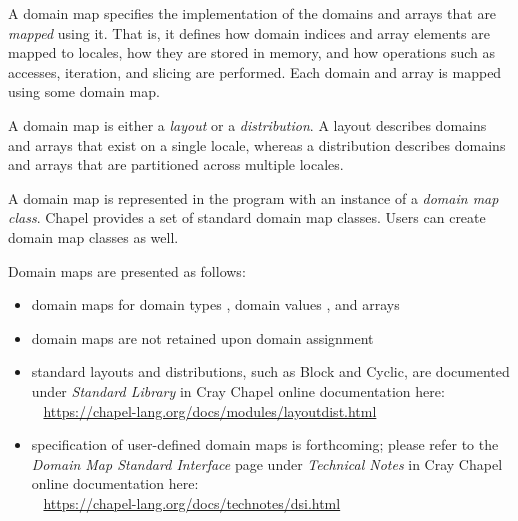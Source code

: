 \label{Domain_Maps}

A domain map specifies the implementation of the domains and arrays
that are \emph{mapped} using it. That is, it defines how domain indices
and array elements are mapped to locales, how they are stored in
memory, and how operations such as accesses, iteration, and slicing
are performed.  Each domain and array is mapped using some domain map.

A domain map is either a \emph{layout} or a \emph{distribution}.
A layout describes domains and arrays that exist on a single locale,
whereas a distribution describes domains and arrays that are
partitioned across multiple locales.

A domain map is represented in the program with an instance of
a \emph{domain map class}.
Chapel provides a set of standard domain map classes.
Users can create domain map classes as well.

Domain maps are presented as follows:
\begin{itemize}

\item domain maps for domain types ,
      domain values , and
      arrays 

\item domain maps are not retained upon domain assignment

\item standard layouts and distributions, such as Block and Cyclic,
are documented under \emph{Standard Library}
in Cray Chapel online documentation here:
\\ %
\mbox{$$ $$ $$} %
\url{https://chapel-lang.org/docs/modules/layoutdist.html}

\item specification of user-defined domain maps is forthcoming;
please refer to the \emph{Domain Map Standard Interface} page
under \emph{Technical Notes}
in Cray Chapel online documentation here:
\\ %
\mbox{$$ $$ $$} %
\url{https://chapel-lang.org/docs/technotes/dsi.html}

\end{itemize}


